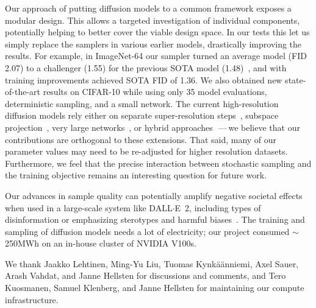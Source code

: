 \documentclass{article}
\newif\ifappendix
\begin{document}
Our approach of putting diffusion models to a common framework exposes a modular design. 
This allows a targeted investigation of individual components, potentially helping to better cover the viable design space.
In our tests this let us simply replace the samplers in various earlier models, drastically improving the results.
For example, in ImageNet-64 our sampler turned an average model (FID 2.07) to a challenger (1.55) for the {previous} SOTA model (1.48)~\cite{Ho2021cascaded},
{and with training improvements achieved SOTA FID of 1.36}.
We also obtained new state-of-the-art results on CIFAR-10 while using only 35 model evaluations, deterministic sampling, and a small network.
The current high-resolution diffusion models rely either on separate super-resolution steps~\cite{Ho2021cascaded,Nichol2021b,Ramesh2022}, subspace projection~\cite{Jing2022}, very large networks~\cite{Dhariwal2021,Song2021sde}, or hybrid approaches~\cite{Preechakul2021diffusion,Rombach2021highresolution,Vahdat2021}\,---\,we believe that our contributions are orthogonal to these extensions.
That said, many of our parameter values may need to be re-adjusted for higher resolution datasets.
{Furthermore, we feel that the precise interaction between stochastic sampling and the training objective remains an interesting question for future work.}

Our advances in sample quality can potentially amplify negative societal effects when used in a large-scale system like DALL$\cdot$E~2, including types of  disinformation or emphasizing sterotypes and harmful biases~\cite{Mishkin2022risks}.
The training and sampling of diffusion models needs a lot of electricity; our project consumed $\sim$250MWh on an in-house cluster of NVIDIA V100s.

{
We thank Jaakko Lehtinen, Ming-Yu Liu, Tuomas Kynk\"a\"anniemi, Axel Sauer, Arash Vahdat, and Janne Hellsten for discussions and comments, and Tero Kuosmanen, Samuel Klenberg, and Janne Hellsten for maintaining our compute infrastructure.
}

{\small
  
  
}

\ifappendix
  \newpage
  \appendix
  {\LARGE\bf Appendices}
	\newcommand{\refpaper}[1]{\ref{#1}}
  \newif\iffigures\figurestrue
  
  
\fi
\end{document}
